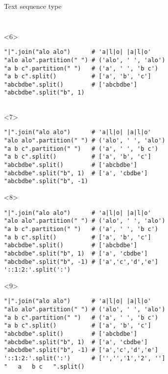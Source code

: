 \begin{frame}[fragile]{Text sequence type}
\begin{columns}[onlytextwidth]
\begin{column}{\textwidth}
\begin{onlyenv}
\begin{lstlisting}[style=python]
 \end{lstlisting}
      \end{onlyenv}

      \begin{onlyenv}<6>
        \begin{lstlisting}[style=python]
"|".join("alo alo")      # 'a|l|o| |a|l|o'
"alo alo".partition(" ") # ('alo', ' ', 'alo')
"a b c".partition(" ")   # ('a', ' ', 'b c')
"a b c".split()          # ['a', 'b', 'c']
"abcbdbe".split()        # ['abcbdbe']
"abcbdbe".split("b", 1)


 \end{lstlisting}
      \end{onlyenv}

      \begin{onlyenv}<7>
        \begin{lstlisting}[style=python]
"|".join("alo alo")      # 'a|l|o| |a|l|o'
"alo alo".partition(" ") # ('alo', ' ', 'alo')
"a b c".partition(" ")   # ('a', ' ', 'b c')
"a b c".split()          # ['a', 'b', 'c']
"abcbdbe".split()        # ['abcbdbe']
"abcbdbe".split("b", 1)  # ['a', 'cbdbe']
"abcbdbe".split("b", -1)

 \end{lstlisting}
      \end{onlyenv}

      \begin{onlyenv}<8>
        \begin{lstlisting}[style=python]
"|".join("alo alo")      # 'a|l|o| |a|l|o'
"alo alo".partition(" ") # ('alo', ' ', 'alo')
"a b c".partition(" ")   # ('a', ' ', 'b c')
"a b c".split()          # ['a', 'b', 'c']
"abcbdbe".split()        # ['abcbdbe']
"abcbdbe".split("b", 1)  # ['a', 'cbdbe']
"abcbdbe".split("b", -1) # ['a','c','d','e']
'::1:2:'.split(':')
 \end{lstlisting}
      \end{onlyenv}

      \begin{onlyenv}<9>
        \begin{lstlisting}[style=python]
"|".join("alo alo")      # 'a|l|o| |a|l|o'
"alo alo".partition(" ") # ('alo', ' ', 'alo')
"a b c".partition(" ")   # ('a', ' ', 'b c')
"a b c".split()          # ['a', 'b', 'c']
"abcbdbe".split()        # ['abcbdbe']
"abcbdbe".split("b", 1)  # ['a', 'cbdbe']
"abcbdbe".split("b", -1) # ['a','c','d','e']
'::1:2:'.split(':')      # ['','','1','2', '']
"   a   b c   ".split() \end{lstlisting}
      \end{onlyenv}


\end{column}
\end{columns}
\end{frame}
